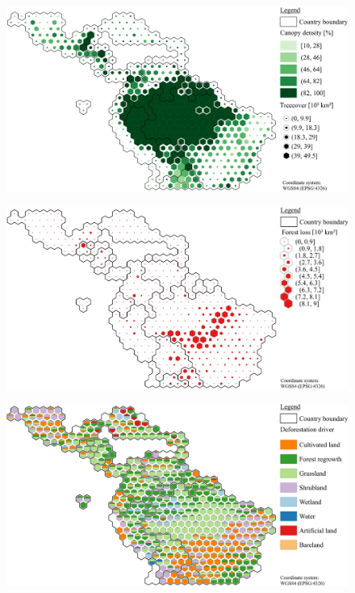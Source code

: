 	\begin{figure}[ht]
		\centering
		\includegraphics[scale=1]{img/americas_treecover_frameless}
		\caption[Ecosystem service values]{}
		\label{fig:americascover}
	\end{figure}
	\begin{figure}[ht]
		\centering
		\includegraphics[scale=1]{img/americas_loss_frameless}
		\caption[Ecosystem service values]{}
		\label{fig:americasloss}
	\end{figure}
	\begin{figure}[ht]
		\centering
		\includegraphics[scale=1]{img/americas_driver_frameless}
		\caption[Ecosystem service values]{}
		\label{fig:americasdriver}
	\end{figure}
